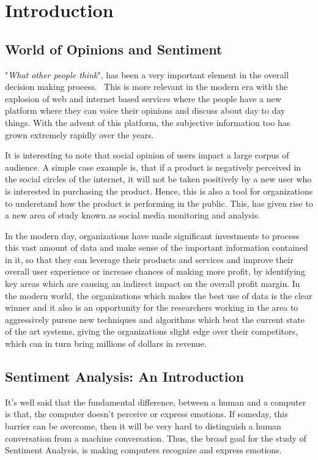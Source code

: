 \chapter{Introduction}\label{chapter:introduction}


\section{World of Opinions and Sentiment}
"\textit{What other people think}", has been a very important element in the overall decision making process.~\parencite{pangleesentiment} This is more relevant in the modern era with the explosion of web and internet based services where the people have a new platform where they can voice their opinions and discuss about day to day things. With the advent of this platform, the subjective information too has grown extremely rapidly over the years.  
\newline

It is interesting to note that social opinion of users impact a large corpus of audience. A simple case example is, that if a product is negatively perceived in the social circles of the internet, it will not be taken positively by a new user who is interested in purchasing the product. Hence, this is also a tool for organizations to understand how the product is performing in the public. This, has given rise to a new area of study known as social media monitoring and analysis. 
\newline

In the modern day, organizations have made significant investments to process this vast amount of data and make sense of the important information contained in it, so that they can leverage their products and services and improve their overall user experience or increase chances of making more profit, by identifying key areas which are causing an indirect impact on the overall profit margin. In the modern world, the organizations which makes the best use of data is the clear winner and it also is an opportunity for the researchers working in the area to aggressively pursue new techniques and algorithms which beat the current state of the art systems, giving the organizations slight edge over their competitors, which can in turn bring millions of dollars in revenue.      
\section{Sentiment Analysis: An Introduction}
It's well said that the fundamental difference, between a human and a computer is that, the computer doesn't perceive or express emotions. If someday, this barrier can be overcome, then it will be very hard to distinguish a human conversation  from a machine conversation. Thus, the broad goal for the study of Sentiment Analysis, is making computers recognize and express emotions.  

